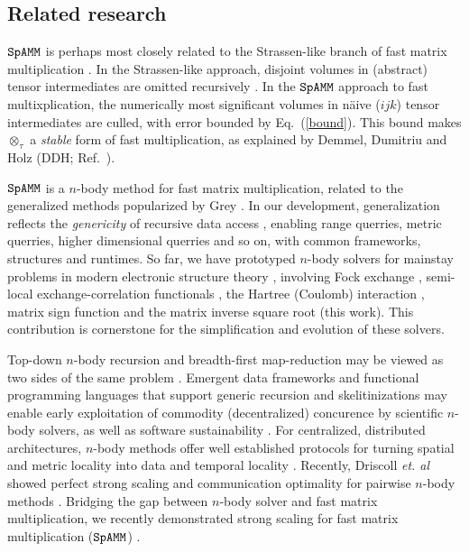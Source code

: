 \documentclass[letterpaper,twocolumn,amsmath,amsfont,amssymb,english,aps,jcp,preprintnumbers,groupaddress,nofootinbib,tightenlines,floatfix]{revtex4}
\newcommand{\ot}{  {\scriptstyle \otimes}_{ \tau } }
\theoremstyle{plain}
\theoremstyle{remark}
\theoremstyle{plain}
\begin{document}
\subsection{Related research} 

$\tt SpAMM$ is perhaps most closely related to the Strassen-like branch of fast matrix multiplication 
\cite{springerlink:10.1007/BF02165411,Ballard2014}.
In the Strassen-like approach, disjoint volumes in (abstract) tensor intermediates are omitted recursively \cite{}.  
In the $\tt SpAMM$ approach to fast multixplication, the numerically most significant volumes in 
 n\"{a}ive ($ijk$) tensor intermediates are culled, with error bounded by Eq.~(\ref{bound}).  
This bound makes $\ot$ a {\em stable} form of fast multiplication,  as explained by Demmel, Dumitriu and Holz (DDH; Ref.~\cite{Demmel07}).

$\tt SpAMM$ is a $n$-body method for fast matrix multiplication, related to the 
generalized methods popularized by Grey \cite{Gray01,Gray2003}. In our development,
generalization reflects the {\em genericity} of recursive data access \cite{genericityindata,Geerts2002,Samet:2006:DBDS} ,
enabling range querries, metric querries, higher dimensional querries and so on, with common frameworks, 
structures and runtimes.  So far, we have prototyped $n$-body solvers for mainstay problems in modern electronic structure theory 
\cite{ostlundszabo, wyang}, 
involving Fock exchange \cite{}, semi-local exchange-correlation functionals \cite{}, 
the Hartree (Coulomb) interaction \cite{}, matrix sign function \cite{} and the matrix inverse square root (this work).
This contribution is cornerstone for the simplification and evolution of these solvers.  

Top-down $n$-body recursion and breadth-first map-reduction may be viewed as two sides of 
the same problem \cite{Aluru}.  Emergent data frameworks and 
functional programming languages that support generic recursion and skelitinizations \cite{March} may enable 
early exploitation of commodity (decentralized) concurence by scientific $n$-body solvers, 
as well as software sustainability \cite{softwaresustainanbilty}.
For centralized, distributed architectures, $n$-body methods offer well established protocols for turning spatial and metric locality into 
data and temporal locality \cite{}.  Recently, Driscoll {\em et. al} showed perfect strong scaling and communication optimality 
for pairwise $n$-body methods \cite{Driscoll13}.   Bridging the gap between 
$n$-body solver and fast matrix multiplication, we recently demonstrated strong scaling for fast matrix multiplication ($\tt SpAMM$) \cite{}.  
\end{document}
